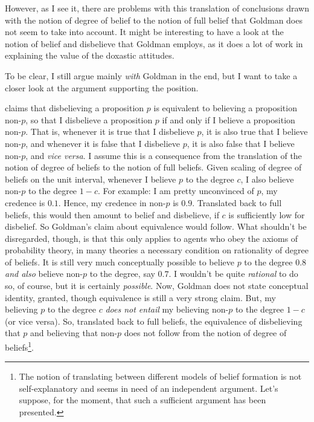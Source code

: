 \documentclass[12pt,numbers=noenddot]{scrartcl}
\begin{document}
However, as I see it, there are problems with this translation of conclusions drawn with the notion of degree of belief to the notion of full belief that Goldman does not seem to take into account. It might be interesting to have a look at the notion of belief and disbelieve that Goldman employs, as it does a lot of work in explaining the value of the doxastic attitudes.

To be clear, I still argue mainly \emph{with} Goldman in the end, but I want to take a closer look at the argument supporting the position.

\textcite[58]{Goldman2002-GOLTUO-2} claims that disbelieving a proposition $p$ is equivalent to believing a proposition non-$p$, so that I disbelieve a proposition $p$ if and only if I believe a proposition non-$p$. That is, whenever it is true that I disbelieve $p$, it is also true that I believe non-$p$, and whenever it is false that I disbelieve $p$, it is also false that I believe non-$p$, and \emph{vice versa}. 
I assume this is a consequence from the translation of the notion of degree of beliefs to the notion of full beliefs. Given scaling of degree of beliefs on the unit interval, whenever I believe $p$ to the degree $c$, I also believe non-$p$ to the degree $1-c$. For example: I am pretty unconvinced of $p$, my credence is $0.1$. Hence, my credence in non-$p$ is $0.9$. Translated back to full beliefs, this would then amount to belief and disbelieve, if $c$ is sufficiently low for disbelief. 
So Goldman's claim about equivalence would follow. What shouldn't be disregarded, though, is that this only applies to agents who obey the axioms of probability theory, in many theories a necessary condition on rationality of degree of beliefs. It is still very much conceptually possible to believe $p$ to the degree $0.8$ \emph{and also} believe non-$p$ to the degree, say $0.7$. I wouldn't be quite \emph{rational} to do so, of course, but it is certainly \emph{possible}. Now, Goldman does not state conceptual identity, granted, though equivalence is still a very strong claim. But, my believing $p$ to the degree $c$ \emph{does not entail} my believing non-$p$ to the degree $1-c$ (or vice versa). 
So, translated back to full beliefs, the equivalence of disbelieving that $p$ and believing that non-$p$ does not follow from the notion of degree of beliefs\footnote{The notion of translating between different models of belief formation is not self-explanatory and seems in need of an independent argument. Let's suppose, for the moment, that such a sufficient argument has been presented.}.
\end{document}
